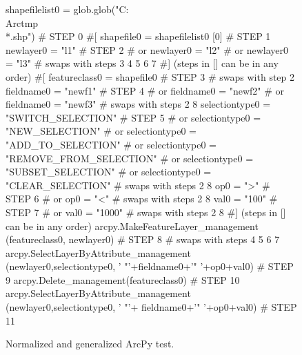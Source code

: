 \begin{figure}[t]
{\scriptsize 
\begin{code}
shapefilelist0 = 
   glob.glob("C:\\Arctmp\\*.shp")        \textcolor{black!60}{\# STEP 0}
\textcolor{black!60}{\#[}
shapefile0 = shapefilelist0 [0]        \textcolor{black!60}{\# STEP 1}
newlayer0 = "l1"                       \textcolor{black!60}{\# STEP 2}
\textcolor{black!60}{\#  or newlayer0 = "l2" }
\textcolor{black!60}{\#  or newlayer0 = "l3" }
\textcolor{black!60}{\#  swaps with steps 3 4 5 6 7}
\textcolor{black!60}{\#] (steps in [] can be in any order)}
\textcolor{black!60}{\#[}
featureclass0 = shapefile0             \textcolor{black!60}{\# STEP 3}
\textcolor{black!60}{\#  swaps with step 2}
fieldname0 = "newf1"                   \textcolor{black!60}{\# STEP 4}
\textcolor{black!60}{\#  or fieldname0 = "newf2" }
\textcolor{black!60}{\#  or fieldname0 = "newf3" }
\textcolor{black!60}{\#  swaps with steps 2 8}
selectiontype0 = "SWITCH\_SELECTION"    \textcolor{black!60}{\# STEP 5}
\textcolor{black!60}{\#  or selectiontype0 = "NEW\_SELECTION" }
\textcolor{black!60}{\#  or selectiontype0 = "ADD\_TO\_SELECTION" }
\textcolor{black!60}{\#  or selectiontype0 = "REMOVE\_FROM\_SELECTION"}
\textcolor{black!60}{\#  or selectiontype0 = "SUBSET\_SELECTION"}
\textcolor{black!60}{\#  or selectiontype0 = "CLEAR\_SELECTION"   }
\textcolor{black!60}{\#  swaps with steps 2 8}
op0 = ">"                              \textcolor{black!60}{\# STEP 6}
\textcolor{black!60}{\#  or op0 = "<" }
\textcolor{black!60}{\#  swaps with steps 2 8}
val0 = "100"                           \textcolor{black!60}{\# STEP 7}
\textcolor{black!60}{\#  or val0 = "1000" }
\textcolor{black!60}{\#  swaps with steps 2 8}
\textcolor{black!60}{\#] (steps in [] can be in any order)}
arcpy.MakeFeatureLayer\_management
   (featureclass0, newlayer0)          \textcolor{black!60}{\# STEP 8}
\textcolor{black!60}{\#  swaps with steps 4 5 6 7}
arcpy.SelectLayerByAttribute\_management
   (newlayer0,selectiontype0,
   ' "'+fieldname0+'" '+op0+val0)      \textcolor{black!60}{\# STEP 9}
arcpy.Delete\_management(featureclass0) \textcolor{black!60}{\# STEP 10}
arcpy.SelectLayerByAttribute\_management
   (newlayer0,selectiontype0,
   ' "'+ fieldname0+'" '+op0+val0)     \textcolor{black!60}{\# STEP 11}
\end{code}
}
\caption{Normalized and generalized ArcPy test.}
\label{esrinormgen}
\end{figure}

